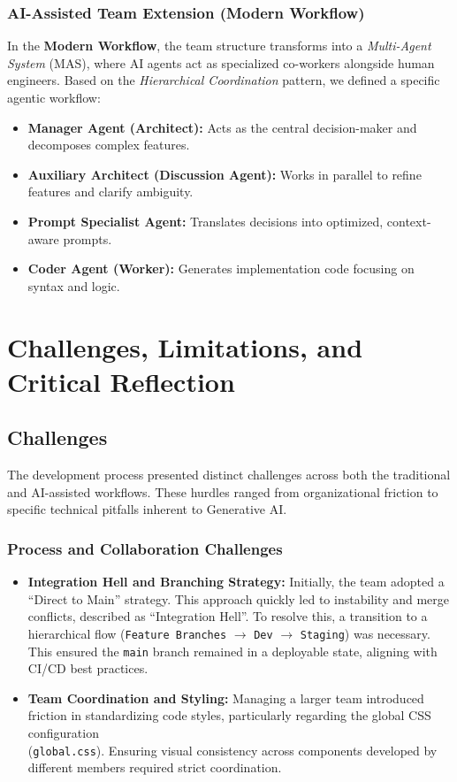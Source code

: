 \documentclass[a4paper,12pt]{report}
\begin{document}
\subsection{AI-Assisted Team Extension (Modern Workflow)}
In the \textbf{Modern Workflow}, the team structure transforms into a \textit{Multi-Agent System} (MAS), where AI agents act as specialized co-workers alongside human engineers. Based on the \textit{Hierarchical Coordination} pattern, we defined a specific agentic workflow:

\begin{itemize}
    \item \textbf{Manager Agent (Architect):} Acts as the central decision-maker and decomposes complex features.
    \item \textbf{Auxiliary Architect (Discussion Agent):} Works in parallel to refine features and clarify ambiguity.
    \item \textbf{Prompt Specialist Agent:} Translates decisions into optimized, context-aware prompts.
    \item \textbf{Coder Agent (Worker):} Generates implementation code focusing on syntax and logic.
\end{itemize}

\chapter{Challenges, Limitations, and Critical Reflection}

    \section{Challenges}
    The development process presented distinct challenges across both the traditional and AI-assisted workflows. These hurdles ranged from organizational friction to specific technical pitfalls inherent to Generative AI.

    \subsection{Process and Collaboration Challenges}
    \begin{itemize}
        \item \textbf{Integration Hell and Branching Strategy:} Initially, the team adopted a ``Direct to Main'' strategy. This approach quickly led to instability and merge conflicts, described as ``Integration Hell''. To resolve this, a transition to a hierarchical flow (\texttt{Feature Branches} $\rightarrow$ \texttt{Dev} $\rightarrow$ \texttt{Staging}) was necessary. This ensured the \texttt{main} branch remained in a deployable state, aligning with CI/CD best practices.
        
        \item \textbf{Team Coordination and Styling:} Managing a larger team introduced friction in standardizing code styles, particularly regarding the global CSS configuration \\ (\texttt{global.css}). Ensuring visual consistency across components developed by different members required strict coordination.
    \end{itemize}
\end{document}
